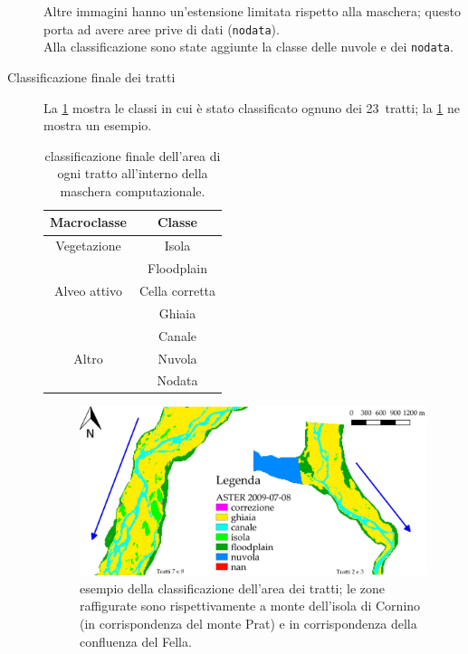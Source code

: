 \begin{description}
	Altre immagini hanno un'estensione limitata rispetto alla maschera; questo porta ad avere aree prive di dati (\texttt{nodata}).
	\\
	Alla classificazione sono state aggiunte la classe delle nuvole e dei \texttt{nodata}.
	\item[Classificazione finale dei tratti] La \cref{tab:class_tratti} mostra le classi in cui è stato classificato ognuno dei 23~tratti; la \cref{fig:class_is_fl} ne mostra un esempio.
	\begin{table}[ht]
		\centering
		\begin{tabular}{
			c 
			c
			}
			\toprule
			\textbf{Macroclasse}	&	\textbf{Classe}	\\
			\midrule
			Vegetazione		&	Isola	\\
							&	Floodplain	\\
			Alveo attivo	&	Cella corretta	\\
							&	Ghiaia	\\
							&	Canale	\\
			Altro			&	Nuvola	\\
							&	Nodata	\\
			\bottomrule
		\end{tabular}
		\caption[classificazione dell'area dei tratti]{classificazione finale dell'area di ogni tratto all'interno della maschera computazionale.}
		\label{tab:class_tratti}
	\end{table}
	\begin{figure}[ht]
		\centering
		\includegraphics[width=\textwidth]{files/esempio_class_is_fl.jpeg}
		\caption[esempio della classificazione dell'area dei tratti]{esempio della classificazione dell'area dei tratti; le zone raffigurate sono rispettivamente a monte dell'isola di Cornino (in corrispondenza del monte Prat) e in corrispondenza della confluenza del Fella.}
		\label{fig:class_is_fl}
	\end{figure}

\end{description}
